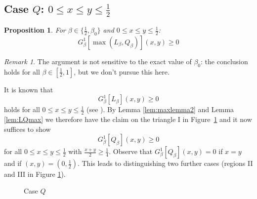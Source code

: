 \documentclass[12pt]{amsart}
\theoremstyle{plain}
\newtheorem{prop}[thm]{Proposition}
\theoremstyle{definition}
\theoremstyle{remark}
\newtheorem{rem}[thm]{Remark}
\numberwithin{equation}{section}
\begin{document}
\subsection{\texorpdfstring{Case $Q$: $0\le x\leq  y \leq\frac12$}{Case Q}}
\label{sec:caseQ}

\begin{prop}
For $\beta\in \{\tfrac12, \beta_0\}$ and $0\le x\le y\le \tfrac12$:
\[ G^1_{\beta}[\max(L_\beta, Q_\beta)](x,y)\ge 0 \]
\end{prop}
\begin{rem}
The argument is not sensitive to the exact value of $\beta_0$: the conclusion holds for all $\beta\in [\tfrac12,1]$, 
but we don't pursue this here.
\end{rem}
It is known that
\[ G^1_\beta[L_\beta](x,y)\ge 0 \]
holds for all $0\le x\le y\le \tfrac12$ (see \cite[Lemma 2.2]{BIM23}).
By Lemma \ref{lem:maxlemma2} and Lemma \ref{lem:LQmax} we therefore have the claim on the triangle I in Figure~\ref{fig:lq} and it now suffices to show
\begin{equation}\label{eqn:GLQge0}
G^1_\beta[Q_\beta](x,y)\ge 0
\end{equation}
for all $0\le x\le y\le \tfrac12$ with $\frac{x+y}{2}\ge \tfrac14$.
Observe that $G_\beta^1[Q_\beta](x,y)=0$ if $x=y$ and if $(x,y)=(0,\tfrac12)$.
This leads to distinguishing two further cases (regions II and III in Figure \ref{fig:lq}).

\begin{figure}[ht]
\centering
{}
\caption{Case $Q$}
\label{fig:lq}
\end{figure}
\end{document}
